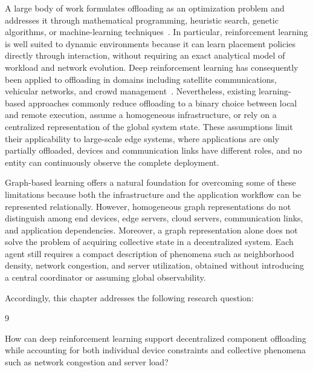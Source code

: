 A large body of work formulates offloading as an optimization problem and addresses it through mathematical programming, 
 heuristic search, genetic algorithms, or machine-learning 
 techniques~\cite{DBLP:journals/comsur/MachB17,DBLP:journals/jnca/LinZCLW20,DBLP:journals/jsa/IslamDGC21,DBLP:journals/cn/SaeikASSDVLAMP21,DBLP:journals/tvt/Al-HabobDAM20}.
%
In particular, 
 reinforcement learning is well suited to dynamic environments because it can learn placement policies directly through interaction, 
 without requiring an exact analytical model of workload and network evolution.
%
Deep reinforcement learning has consequently been applied to offloading in domains including satellite communications, 
 vehicular networks, and crowd management~\cite{DBLP:journals/tvt/ChaiZYXGG23,DBLP:journals/iotj/CuiLZZLQ23,DBLP:journals/tits/WangPLQRWYZZ23}.
%
Nevertheless, 
 existing learning-based approaches commonly reduce offloading to a binary choice between local and remote execution,
  assume a homogeneous infrastructure, or rely on a centralized representation of the global system state.
%
These assumptions limit their applicability to large-scale edge systems, where applications are only partially offloaded, 
 devices and communication links have different roles, and no entity can continuously observe the complete deployment.

Graph-based learning offers a natural foundation for overcoming some of these limitations because 
 both the infrastructure and the application workflow can be represented relationally.
%
However, 
 homogeneous graph representations do not distinguish among end devices, 
 edge servers, cloud servers, communication links, and application dependencies.
%
Moreover, 
 a graph representation alone does not solve the problem of acquiring collective state in a decentralized system.
%
Each agent still requires a compact description of phenomena such as neighborhood density, 
 network congestion, and server utilization, obtained without introducing a central coordinator 
 or assuming global observability.

Accordingly, this chapter addresses the following research question:

\begin{chapRQ}{9}
  \item
  How can deep reinforcement learning support decentralized component offloading while accounting
  for both individual device constraints and collective phenomena such as network congestion and server load?
  \label{idhgql-rq}
\end{chapRQ}

